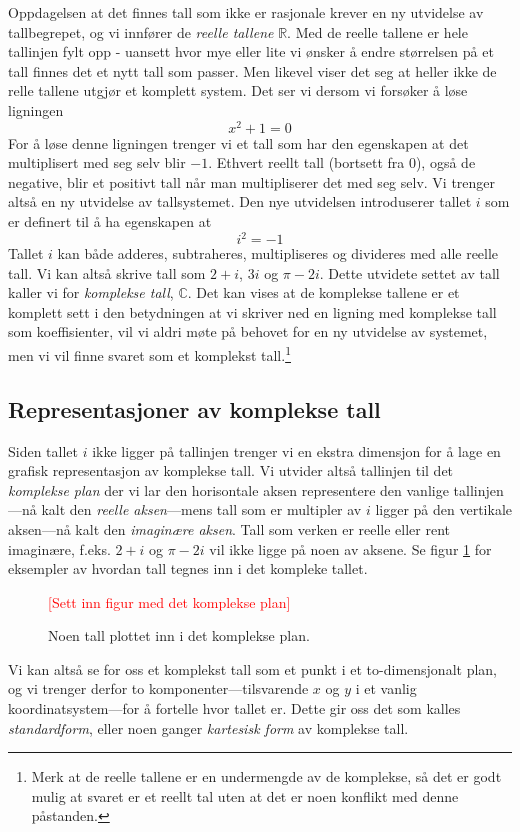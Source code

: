\documentclass[a4paper,norsk,12pt]{article}
\begin{document}
Oppdagelsen at det finnes tall som ikke er rasjonale krever en ny utvidelse av tallbegrepet, og vi innfører de \emph{reelle tallene} $\mathbb{R}$. Med de reelle tallene er hele tallinjen fylt opp - uansett hvor mye eller lite vi ønsker å endre størrelsen på et tall finnes det et nytt tall som passer. Men likevel viser det seg at heller ikke de relle tallene utgjør et komplett system. Det ser vi dersom vi forsøker å løse ligningen
\begin{displaymath}
	x^2+1 = 0
\end{displaymath}
For å løse denne ligningen trenger vi et tall som har den egenskapen at det multiplisert med seg selv blir $-1$. Ethvert reellt tall (bortsett fra 0), også de negative, blir et positivt tall når man multipliserer det med seg selv. Vi trenger altså en ny utvidelse av tallsystemet. Den nye utvidelsen introduserer tallet $i$ som er definert til å ha egenskapen at 
\begin{displaymath}
	i^2 = -1
\end{displaymath}
Tallet $i$ kan både adderes, subtraheres, multipliseres og divideres med alle reelle tall. Vi kan altså skrive tall som $2+i$, $3i$ og $\pi-2i$. Dette utvidete settet av tall kaller vi for \emph{komplekse tall}, $\mathbb{C}$. Det kan vises at de komplekse tallene er et komplett sett i den betydningen at vi skriver ned en ligning med komplekse tall som koeffisienter, vil vi aldri møte på behovet for en ny utvidelse av systemet, men vi vil finne svaret som et komplekst tall.\footnote{Merk at de reelle tallene er en undermengde av de komplekse, så det er godt mulig at svaret er et reellt tal uten at det er noen konflikt med denne påstanden.}

\subsection{Representasjoner av komplekse tall}
Siden tallet $i$ ikke ligger på tallinjen trenger vi en ekstra dimensjon for å lage en grafisk representasjon av komplekse tall. Vi utvider altså tallinjen til det \emph{komplekse plan} der vi lar den horisontale aksen representere den vanlige tallinjen---nå kalt den \emph{reelle aksen}---mens tall som er multipler av $i$ ligger på den vertikale aksen---nå kalt den \emph{imaginære aksen}. Tall som verken er reelle eller rent imaginære, f.eks. $2+i$ og $\pi - 2i$ vil ikke ligge på noen av aksene. Se figur \ref{kompleks:fig:plan} for eksempler av hvordan tall tegnes inn i det kompleke tallet.
\begin{figure}[htp]
	\begin{center}
	\textcolor{red}{[Sett inn figur med det komplekse plan]}
	\end{center}
	\caption{Noen tall plottet inn i det komplekse plan.}
	\label{kompleks:fig:plan}
\end{figure}
Vi kan altså se for oss et komplekst tall som et punkt i et to-dimensjonalt plan, og vi trenger derfor to komponenter---tilsvarende $x$ og $y$ i et vanlig koordinatsystem---for å fortelle hvor tallet er. Dette gir oss det som kalles \emph{standardform}, eller noen ganger \emph{kartesisk form} av komplekse tall.
\end{document}
